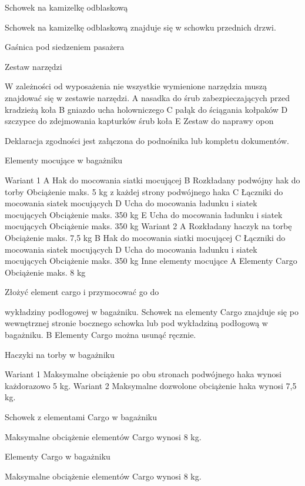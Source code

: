 Schowek na kamizelkę odblaskową

Schowek na kamizelkę odblaskową znajduje się w schowku przednich drzwi.

Gaśnica pod siedzeniem pasażera

Zestaw narzędzi

W zależności od wyposażenia nie wszystkie wymienione narzędzia muszą znajdować się w zestawie narzędzi.
A nasadka do śrub zabezpieczających przed kradzieżą koła
B gniazdo ucha holowniczego
C pałąk do ściągania kołpaków
D szczypce do zdejmowania kapturków śrub koła
E Zestaw do naprawy opon

Deklaracja zgodności jest załączona do podnośnika lub kompletu dokumentów.

Elementy mocujące w bagażniku


Wariant 1
A Hak do mocowania siatki mocującej
B Rozkładany podwójny hak do torby
Obciążenie maks. 5 kg z każdej strony podwójnego haka
C Łączniki do mocowania siatek mocujących
D Ucha do mocowania ładunku i siatek mocujących
Obciążenie maks. 350 kg
E Ucha do mocowania ładunku i siatek mocujących
Obciążenie maks. 350 kg
Wariant 2
A Rozkładany haczyk na torbę
Obciążenie maks. 7,5 kg
B Hak do mocowania siatki mocującej
C Łączniki do mocowania siatek mocujących
D Ucha do mocowania ładunku i siatek mocujących
Obciążenie maks. 350 kg
Inne elementy mocujące
A Elementy Cargo
Obciążenie maks. 8 kg
\begin{itemizeArrow}
	\itemArrow Złożyć element cargo i przymocować go do
\end{itemizeArrow}
wykładziny podłogowej w bagażniku.
Schowek na elementy Cargo znajduje się po
wewnętrznej stronie bocznego schowka lub
pod wykładziną podłogową w bagażniku.
B Elementy Cargo można usunąć ręcznie.

Haczyki na torby w bagażniku

Wariant 1
Maksymalne obciążenie po obu stronach podwójnego haka wynosi każdorazowo 5 kg.
Wariant 2
Maksymalne dozwolone obciążenie haka wynosi 7,5 kg.


Schowek z elementami Cargo w bagażniku


Maksymalne obciążenie elementów Cargo wynosi 8 kg.

Elementy Cargo w bagażniku


Maksymalne obciążenie elementów Cargo wynosi 8 kg.

